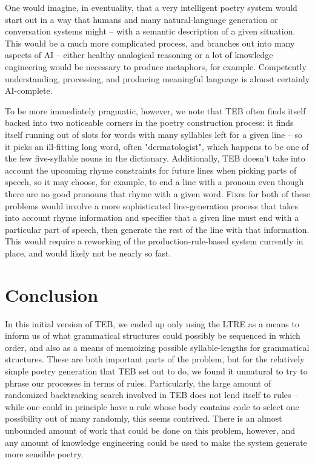 \documentclass[12pt]{article}
\begin{document}
\bigskip
One would imagine, in eventuality, that a very intelligent poetry system
would start out in a way that humans and many natural-language generation
or conversation systems might -- with a semantic description of a given
situation. This would be a much more complicated process, and branches out
into many aspects of AI -- either healthy analogical reasoning or a lot of
knowledge engineering would be necessary to produce metaphors, for example.
Competently understanding, processing, and producing meaningful language is
almost certainly AI-complete.

\bigskip
To be more immediately pragmatic, however, we note that TEB often finds
itself backed into two noticeable corners in the poetry construction
process: it finds itself running out of slots for words with many syllables
left for a given line -- so it picks an ill-fitting long word, often
"dermatologist", which happens to be one of the few five-syllable nouns in
the dictionary. Additionally, TEB doesn't take into account the upcoming
rhyme constraints for future lines when picking parts of speech, so it may
choose, for example, to end a line with a pronoun even though there are no
good pronouns that rhyme with a given word. Fixes for both of these
problems would involve a more sophisticated line-generation process that
takes into account rhyme information and specifies that a given line must
end with a particular part of speech, then generate the rest of the line
with that information. This would require a reworking of the
production-rule-based system currently in place, and would likely not be
nearly so fast.

\section{Conclusion}
In this initial version of TEB, we ended up only using the LTRE as a means
to inform us of what grammatical structures could possibly be sequenced in
which order, and also as a means of memoizing possible syllable-lengths for
grammatical structures. These are both important parts of the problem, but
for the relatively simple poetry generation that TEB set out to do, we
found it unnatural to try to phrase our processes in terms of rules.
Particularly, the large amount of randomized backtracking search involved
in TEB does not lend itself to rules -- while one could in principle have a
rule whose body contains code to select one possibility out of many
randomly, this seems contrived. There is an almost unbounded amount of work
that could be done on this problem, however, and any amount of knowledge
engineering could be used to make the system generate more sensible poetry.

\newpage

\end{document}
